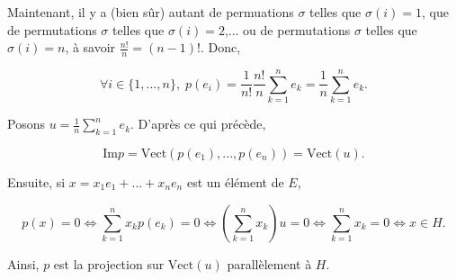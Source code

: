 {{Maintenant, il y a (bien sûr) autant de permuations $\sigma$ telles que $\sigma(i)=1$, que de permutations $\sigma$ telles que $\sigma(i)=2$,... ou de permutations $\sigma$ telles que $\sigma(i)=n$, à savoir $\frac{n!}{n}=(n-1)!$. Donc,

$$\forall i\in\{1,...,n\},\;p(e_i)=\frac{1}{n!}\frac{n!}{n}\sum_{k=1}^{n}e_k=\frac{1}{n}\sum_{k=1}^{n}e_k.$$

Posons $u=\frac{1}{n}\sum_{k=1}^{n}e_k$. D'après ce qui précède,

$$\mbox{Im}p=\mbox{Vect}(p(e_1),...,p(e_n))=\mbox{Vect}(u).$$

Ensuite, si $x=x_1e_1+...+x_ne_n$ est un élément de $E$,

$$p(x)=0\Leftrightarrow\sum_{k=1}^{n}x_kp(e_k)=0\Leftrightarrow(\sum_{k=1}^{n}x_k)u=0\Leftrightarrow\sum_{k=1}^{n}x_k=0\Leftrightarrow x\in H.$$

Ainsi, $p$ est la projection sur $\mbox{Vect}(u)$ parallèlement à $H$.
}
}
